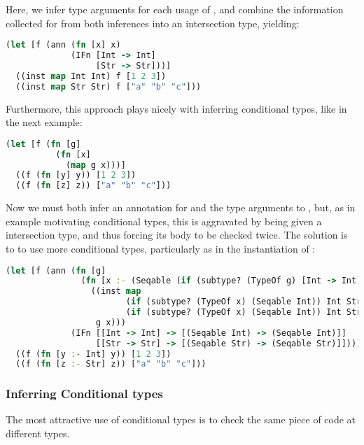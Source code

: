 Here, we infer type arguments for each usage of ,
and combine the information collected for  from both
inferences into an intersection type, yielding:

\begin{lstlisting}[language=Clojure]
(let [f (ann (fn [x] x)
             (IFn [Int -> Int]
                  [Str -> Str]))]
  ((inst map Int Int) f [1 2 3])
  ((inst map Str Str) f ["a" "b" "c"]))
\end{lstlisting}

Furthermore, this approach plays nicely with inferring conditional types,
like in the next example:

\begin{lstlisting}[language=Clojure]
(let [f (fn [g]
          (fn [x]
            (map g x)))]
  ((f (fn [y] y)) [1 2 3])
  ((f (fn [z] z)) ["a" "b" "c"]))
\end{lstlisting}

Now we must both infer an annotation for  and
the type arguments to , but, as
in example motivating conditional types,
this is aggravated by  being given a
intersection type, and thus forcing its body to be checked twice.
The solution is to to use more conditional types, particularly
as in the instantiation of :

\begin{lstlisting}[language=Clojure]
(let [f (ann (fn [g]
               (fn [x :- (Seqable (if (subtype? (TypeOf g) [Int -> Int]) Int Str))]
                 ((inst map
                        (if (subtype? (TypeOf x) (Seqable Int)) Int Str)
                        (if (subtype? (TypeOf x) (Seqable Int)) Int Str))
                  g x)))
             (IFn [[Int -> Int] -> [(Seqable Int) -> (Seqable Int)]]
                  [[Str -> Str] -> [(Seqable Str) -> (Seqable Str)]]))]
  ((f (fn [y :- Int] y)) [1 2 3])
  ((f (fn [z :- Str] z)) ["a" "b" "c"]))
\end{lstlisting}

\subsubsection{Inferring Conditional types}

The most attractive use of conditional types is to check the
same piece of code at different types.

